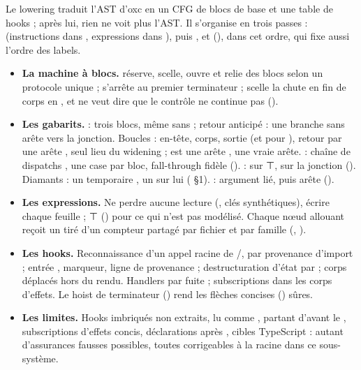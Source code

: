 \begin{resume}
Le lowering traduit l'AST d'oxc en un CFG de blocs de base et une table de hooks ; après lui, rien ne voit plus l'AST. Il s'organise en trois passes :  (instructions dans , expressions dans ), puis ,  et  (), dans cet ordre, qui fixe aussi l'ordre des labels.

\begin{itemize}
  \item \textbf{La machine à blocs.}  réserve, scelle, ouvre et relie des blocs selon un protocole unique ;  s'arrête au premier terminateur ;  scelle la chute en fin de corps en , et  ne veut dire que \og le contrôle ne continue pas\fg{} ().
  \item \textbf{Les gabarits.}  : trois blocs, même sans  ; retour anticipé : une branche sans arête vers la jonction. Boucles : en-tête, corps, sortie (et  pour ), retour par une arête , seul lieu du widening ;  est une arête ,  une vraie arête.  : chaîne de dispatchs , une case par bloc, fall-through fidèle ().  :  sur ⊤,  sur la jonction (). Diamants : un temporaire , un  sur lui ( §1).  : argument lié, puis arête  ().
  \item \textbf{Les expressions.} Ne perdre aucune lecture (, clés synthétiques), écrire chaque feuille ; ⊤ () pour ce qui n'est pas modélisé. Chaque nœud allouant reçoit un  tiré d'un compteur partagé par fichier et par famille (, ).
  \item \textbf{Les hooks.} Reconnaissance d'un appel racine de /, par provenance d'import ; entrée , marqueur, ligne de provenance ; destructuration d'état par  ; corps déplacés hors du rendu. Handlers par fuite ; subscriptions dans les corps d'effets. Le hoist de terminateur () rend les flèches concises () sûres.
  \item \textbf{Les limites.} Hooks imbriqués non extraits,  lu comme \code{||},  partant d'avant le , subscriptions d'effets concis, déclarations après , cibles TypeScript : autant d'assurances fausses possibles, toutes corrigeables à la racine dans ce sous-système.
\end{itemize}


\end{resume}
